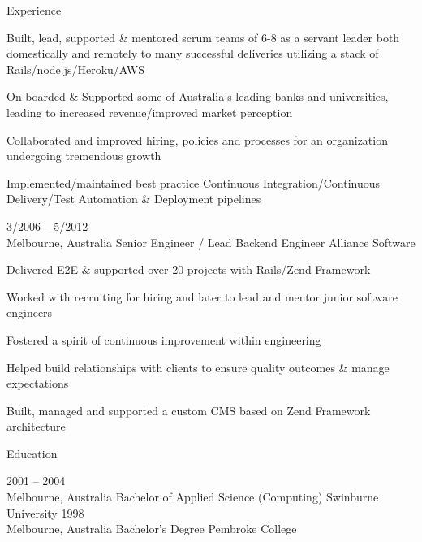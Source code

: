\documentclass[9pt]{developercv} %
\begin{document}
\begin{cvsect}{Experience}
\begin{entrylist}
      {Built, lead, supported \& mentored scrum teams of 6-8 as a servant leader both domestically and remotely to many successful deliveries utilizing a stack of  Rails/node.js/Heroku/AWS
      \par\medskip On-boarded \& Supported some of Australia's leading banks and universities, leading to increased revenue/improved market perception
      \par\medskip Collaborated and improved hiring, policies and processes for an organization undergoing tremendous growth
      \par\medskip Implemented/maintained best practice Continuous
      Integration/Continuous Delivery/Test Automation \& Deployment pipelines}
    \entry
      {3/2006 -- 5/2012\\\footnotesize{Melbourne, Australia}}
      {Senior Engineer / Lead Backend Engineer}
      {Alliance Software}
      {Delivered E2E \& supported over 20 projects with Rails/Zend Framework
      \par\medskip Worked with recruiting for hiring and later to lead and mentor junior software engineers
      \par\medskip Fostered a spirit of continuous improvement within engineering
      \par\medskip Helped build relationships with clients to ensure quality outcomes \& manage expectations
      \par\medskip Built, managed and supported a custom CMS based on Zend
      Framework architecture}
  \end{entrylist}
\end{cvsect}


\begin{cvsect}{Education}

  \begin{entrylist}
    \entry
      {2001 -- 2004\\\footnotesize{Melbourne, Australia}}
      {Bachelor of Applied Science (Computing)}
      {Swinburne University}
      {}
    \entry
      {1998\\\footnotesize{Melbourne, Australia}}
      {Bachelor's Degree}
      {Pembroke College}
      {}
  \end{entrylist}
\end{cvsect}
\end{document}
